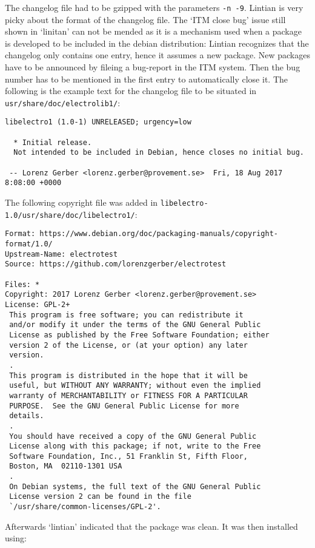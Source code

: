 \documentclass[a4paper,11pt,twoside]{article}
\begin{document}
The changelog file had to be gzipped with the parameters \verb+-n -9+. Lintian
is very picky about the format of the changelog file. The `ITM close bug'
issue still shown in `linitan'  can not be mended as it is a mechanism used
when a package is developed to be included in the debian distribution: Lintian
recognizes that the changelog only contains one entry, hence it assumes a new
package. New packages have to be announced by fileing a bug-report in the ITM
system. Then the bug number has to be mentioned in the first entry to automatically
close it. The following is the example text for the changelog file to be situated
in \verb+usr/share/doc/electrolib1/+:
\begin{verbatim}
libelectro1 (1.0-1) UNRELEASED; urgency=low

  * Initial release.
  Not intended to be included in Debian, hence closes no initial bug.

 -- Lorenz Gerber <lorenz.gerber@provement.se>  Fri, 18 Aug 2017 8:08:00 +0000
\end{verbatim}

The following copyright file was added in
\verb+libelectro-1.0/usr/share/doc/libelectro1/+:
\begin{verbatim}
Format: https://www.debian.org/doc/packaging-manuals/copyright-format/1.0/
Upstream-Name: electrotest
Source: https://github.com/lorenzgerber/electrotest

Files: *
Copyright: 2017 Lorenz Gerber <lorenz.gerber@provement.se>
License: GPL-2+
 This program is free software; you can redistribute it
 and/or modify it under the terms of the GNU General Public
 License as published by the Free Software Foundation; either
 version 2 of the License, or (at your option) any later
 version.
 .
 This program is distributed in the hope that it will be
 useful, but WITHOUT ANY WARRANTY; without even the implied
 warranty of MERCHANTABILITY or FITNESS FOR A PARTICULAR
 PURPOSE.  See the GNU General Public License for more
 details.
 .
 You should have received a copy of the GNU General Public
 License along with this package; if not, write to the Free
 Software Foundation, Inc., 51 Franklin St, Fifth Floor,
 Boston, MA  02110-1301 USA
 .
 On Debian systems, the full text of the GNU General Public
 License version 2 can be found in the file
 `/usr/share/common-licenses/GPL-2'.
\end{verbatim}

Afterwards `lintian' indicated that the package was clean. It was then installed using:
\end{document}
